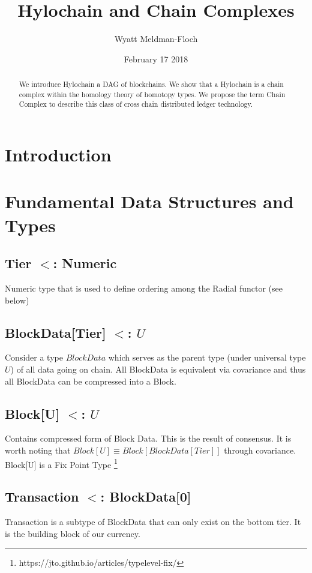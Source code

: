 \documentclass{article}
\title{Hylochain and Chain Complexes}
\author{Wyatt Meldman-Floch}
\date{February 17 2018}
\begin{document}
\maketitle

\begin{abstract}
We introduce Hylochain a DAG of blockchains. We show that a Hylochain is a chain complex within the homology theory of homotopy types. We propose the term Chain Complex to describe this class of cross chain distributed ledger technology.

\end{abstract}
\setcounter{secnumdepth}{0}
\section{Introduction}

\section{Fundamental Data Structures and Types}
\subsection{Tier $<$: Numeric}
Numeric type that is used to define ordering among the Radial functor (see below)

\subsection{BlockData[Tier] $<$: $U$}
Consider a type $BlockData$ which serves as the parent type (under universal type $U$) of all data going on chain. All BlockData is equivalent via covariance and thus all BlockData can be compressed into a Block.

\subsection{Block[U] $<$: $U$}
Contains compressed form of Block Data. This is the result of consensus. It is worth noting that $Block[U] \equiv Block[BlockData[Tier]]$ through covariance. Block[U] is a Fix Point Type \footnote{https://jto.github.io/articles/typelevel-fix/}

\subsection{Transaction $<$: BlockData[0]}
Transaction is a subtype of BlockData that can only exist on the bottom tier. It is the building block of our currency.
\end{document}
